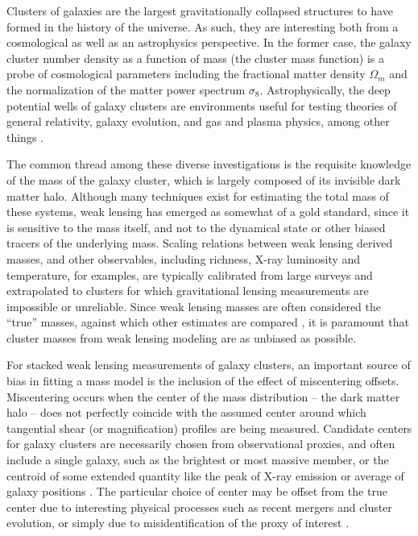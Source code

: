 \documentclass[twocolumn]{aastex6}
\begin{document}
Clusters of galaxies are the largest gravitationally collapsed structures to have formed in the history of the universe.  As such, they are interesting both from a cosmological as well as an astrophysics perspective. In the former case, the galaxy cluster number density as a function of mass (the cluster mass function) is a probe of cosmological parameters including the fractional matter density $\Omega_m$ and the normalization of the matter power spectrum $\sigma_8$. Astrophysically, the deep potential wells of galaxy clusters are environments useful for testing theories of general relativity, galaxy evolution, and gas and plasma physics, among other things \citep{Voit05}.

The common thread among these diverse investigations is the requisite knowledge of the mass of the galaxy cluster, which is largely composed of its invisible dark matter halo. Although many techniques exist for estimating the total mass of these systems, weak lensing has emerged as somewhat of a gold standard, since it is sensitive to the mass itself, and not to the dynamical state or other biased tracers of the underlying mass. Scaling relations between weak lensing derived masses, and other observables, including richness, X-ray luminosity and temperature, for examples, are typically calibrated from large surveys and extrapolated to clusters for which gravitational lensing measurements are impossible or unreliable. Since weak lensing masses are often considered the ``true'' masses, against which other estimates are compared \citep[e.g.][]{Leauthaud10, vonderLinden14, Hoekstra15}, it is paramount that cluster masses from weak lensing modeling are as unbiased as possible.

For stacked weak lensing measurements of galaxy clusters, an important source of bias in fitting a mass model is the inclusion of the effect of miscentering offsets. Miscentering occurs when the center of the mass distribution -- the dark matter halo -- does not perfectly coincide with the assumed center around which tangential shear (or magnification) profiles are being measured. Candidate centers for galaxy clusters are necessarily chosen from observational proxies, and often include a single galaxy, such as the brightest or most massive member, or the centroid of some extended quantity like the peak of X-ray emission or average of galaxy positions \citep{George12}. The particular choice of center may be offset from the true center due to interesting physical processes such as recent mergers and cluster evolution, or simply due to misidentification of the proxy of interest \citep{Johnston07}.
\end{document}
